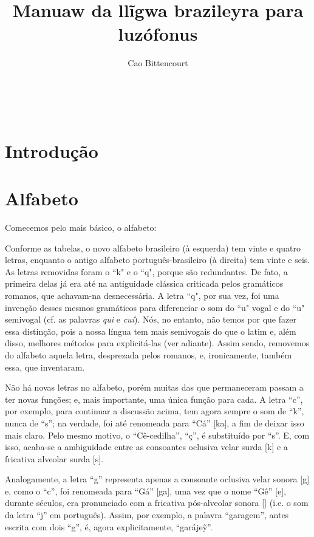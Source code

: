 \documentclass[12pt, a5paper, titlepage]{article}
\title{Manuaw da llĩgwa brazileyra para luzófonus}
\author{Cao Bittencourt}
\date{}
\begin{document}
\maketitle
\thispagestyle{empty}

\newpage \
\thispagestyle{empty}

\newpage
\begin{bilingualpages}
    \rightpage
    \section{Introdução}

    \newpage
    \section{Alfabeto}
    Comecemos pelo mais básico, o alfabeto:

    \PtTableAbc
    Conforme as tabelas, o novo alfabeto brasileiro (à esquerda) tem vinte e quatro letras, enquanto o antigo alfabeto português-brasileiro (à direita) tem vinte e seis. As letras removidas foram o ``k" e o ``q", porque são redundantes. De fato, a primeira delas já era até na antiguidade clássica criticada pelos gramáticos romanos, que achavam-na desnecessária. A letra ``q", por sua vez, foi uma invenção desses mesmos gramáticos para diferenciar o som do ``u" vogal e do ``u" semivogal (cf. as palavras \textit{qui} e \textit{cui}). Nós, no entanto, não temos por que fazer essa distinção, pois a nossa língua tem mais semivogais do que o latim e, além disso, melhores métodos para explicitá-las (ver adiante). Assim sendo, removemos do alfabeto aquela letra, desprezada pelos romanos, e, ironicamente, também essa, que inventaram.

    Não há novas letras no alfabeto, porém muitas das que permaneceram passam a ter
    novas funções; e, mais importante, uma única função para cada. A letra ``c'',
    por exemplo, para continuar a discussão acima, tem agora sempre o som de ``k'',
    nunca de ``s''; na verdade, foi até renomeada para ``Cá'' [ka], a fim de deixar
    isso mais claro. Pelo mesmo motivo, o ``Cê-cedilha'', ``ç'', é substituído por
    ``s''. E, com isso, acaba-se a ambiguidade entre as consoantes oclusiva velar
    surda [k] e a fricativa alveolar surda [s].

    Analogamente, a letra ``g'' representa apenas a consoante oclusiva velar sonora
        [g] e, como o ``c'', foi renomeada para ``Gá'' [ga], uma vez que o nome ``Gê''
    [\textyogh e], durante séculos, era pronunciado com a fricativa pós-alveolar
    sonora [\textyogh] (i.e. o som da letra ``j'' em português). Assim, por
    exemplo, a palavra ``garagem'', antes escrita com dois ``g'', é, agora
    explicitamente, ``garáje\~y''.


\end{bilingualpages}
\end{document}
